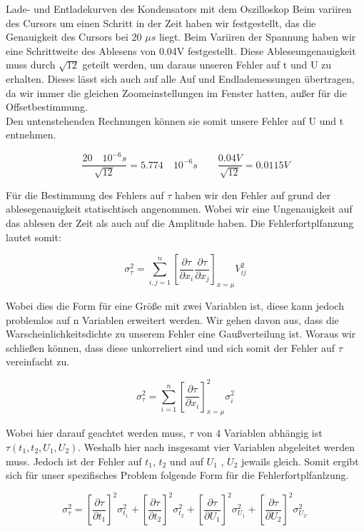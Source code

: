 \documentclass[twoside]{protokoll}
\begin{document}
\begin{aufgabe}{Lade- und Entladekurven des Kondensators mit dem Oszilloskop}
Beim variiren des Cursors um einen Schritt in der Zeit haben wir festgestellt, das die Genauigkeit des Cursors bei 20 $\mu s$ liegt.
Beim Variiren der Spannung haben wir eine Schrittweite des Ablesens von 0.04V festgestellt.
Diese Ableseungenauigkeit muss durch $\sqrt{12}$ geteilt werden, um daraus unseren Fehler auf t und U zu erhalten. 
Dieses lässt sich auch auf alle Auf und Endlademessungen übertragen, da wir immer die gleichen Zoomeinstellungen im Fenster hatten, außer für die Offsetbestimmung. \\
 
Den untenstehenden Rechnungen können sie somit unsere Fehler auf U und t entnehmen. 

\begin{equation}
	\frac{20\quad 10^{-6}s}{\sqrt{12}} = 5.774 \quad 10^{-6}s \qquad  \frac{0.04V}{\sqrt{12}} = 0.0115V 
\end{equation}


Für die Bestimmung des Fehlers auf $\tau$ haben wir den Fehler auf grund der ablesegenauigkeit statischtisch angenommen. Wobei wir eine Ungenauigkeit auf das ablesen der Zeit als auch auf die Amplitude haben. Die Fehlerfortplfanzung lautet somit: 

\begin{equation}
	\sigma_{\tau}^2 = \sum_{i,j=1}^n\left[\frac{\partial \tau}{\partial x_i}\frac{\partial \tau}{\partial x_j}\right]_{x=\mu}V_{ij}^2
\end{equation}

Wobei dies die Form für eine Größe mit zwei Variablen ist, diese kann jedoch problemlos auf n Variablen erweitert werden.
Wir gehen davon aus, dass die Warscheinlichkeitsdichte zu unserem Fehler eine Gaußverteilung ist.
Woraus wir schließen können, dass diese unkorreliert sind und sich somit der Fehler auf $\tau$ vereinfacht zu. 

\begin{equation}
	\sigma_{\tau}^2 = \sum_{i=1}^n\left[\frac{\partial \tau}{\partial x_i}\right]^2_{x=\mu}\sigma_{i}^2
\end{equation}

Wobei hier darauf geachtet werden muss, $\tau$ von 4 Variablen abhängig ist $\tau\left(t_1, t_2, U_1, U_2\right)$.
Weshalb hier nach insgesamt vier Variablen abgeleitet werden muss. Jedoch ist der Fehler auf $t_1$, $t_2$ und auf $U_1$ , $U_2$ jewails gleich. Somit ergibt sich für unser spezifisches Problem folgende Form für die Fehlerfortplfanlzung. 

\begin{equation}
	\sigma_{\tau}^2 = \left[\frac{\partial \tau}{\partial t_1}\right]^2\sigma_{t_1}^2 + \left[\frac{\partial \tau}{\partial t_2}\right]^2\sigma_{t_2}^2 + \left[\frac{\partial \tau}{\partial U_1}\right]^2\sigma_{U_1}^2 + \left[\frac{\partial \tau}{\partial U_2}\right]^2\sigma_{U_2.}^2
\end{equation}


\end{aufgabe}
\end{document}
